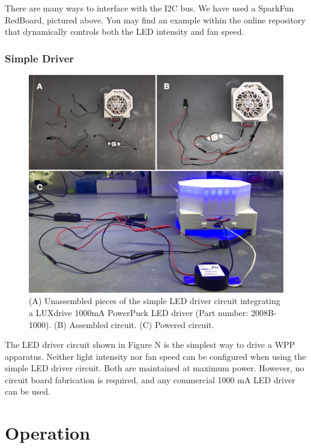 \documentclass[11pt]{article}
\let\stdsection\section
\renewcommand\section{\clearpage\stdsection}
\begin{document}
There are many ways to interface with the I2C bus.
We have used a SparkFun RedBoard, pictured above.
You may find an example within the online repository that dynamically controls both the LED intensity and fan speed.



\subsubsection{Simple Driver} \label{SEC:simple-driver}

\begin{figure}[H]
	\centering
	\includegraphics[width=\textwidth]{"./fign7.png"}
	\caption{(A) Unassembled pieces of the simple LED driver circuit integrating a LUXdrive 1000mA PowerPuck LED driver (Part number: 2008B-1000). (B) Assembled circuit. (C) Powered circuit.}
\end{figure}

The LED driver circuit shown in Figure N is the simplest way to drive a WPP apparatus.
Neither light intensity nor fan speed can be configured when using the simple LED driver circuit.
Both are maintained at maximum power.
However, no circuit board fabrication is required, and any commercial 1000 mA LED driver can be used.

\section{Operation}
\end{document}
